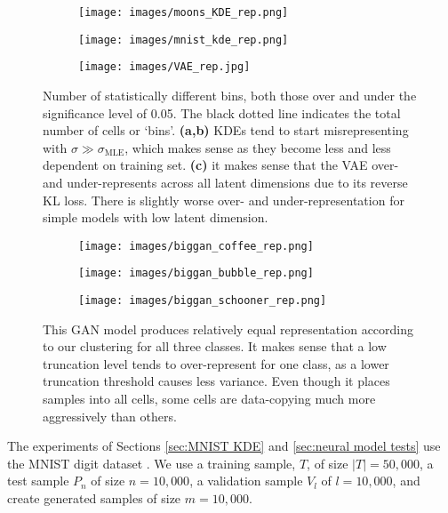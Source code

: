\begin{figure*}[h]
    \centering
    \begin{subfigure}{.31\linewidth}
        \centering
        \texttt{[image: images/moons\_KDE\_rep.png]}
        \caption{}\label{fig:moons KDE rep}
    \end{subfigure}
        \hfill
    \begin{subfigure}{.31\linewidth}
        \centering
        \texttt{[image: images/mnist\_kde\_rep.png]}
        \caption{}\label{fig:mnist kde rep}
    \end{subfigure}
        \hfill
    \begin{subfigure}{.31\linewidth}
        \centering
        \texttt{[image: images/VAE\_rep.jpg]}
        \caption{}\label{fig:vae rep}
    \end{subfigure}
    \caption{Number of statistically different bins, both those over and under the significance level of 0.05. The black dotted line indicates the total number of cells or `bins'. \textbf{(a,b)} KDEs tend to start misrepresenting with $\sigma \gg \sigma_{\text{MLE}}$, which makes sense as they become less and less dependent on training set. \textbf{(c)} it makes sense that the VAE over- and under-represents across all latent dimensions due to its reverse KL loss. There is slightly worse over- and under-representation for simple models with low latent dimension. }
    \label{fig:rep tests 1}
\end{figure*} 

\begin{figure*}[h]
    \centering
    \begin{subfigure}{.31\linewidth}
        \centering
        \texttt{[image: images/biggan\_coffee\_rep.png]}
        \caption{}\label{fig:moons KDE rep}
    \end{subfigure}
        \hfill
    \begin{subfigure}{.31\linewidth}
        \centering
        \texttt{[image: images/biggan\_bubble\_rep.png]}
        \caption{}\label{fig:mnist kde rep}
    \end{subfigure}
        \hfill
    \begin{subfigure}{.31\linewidth}
        \centering
        \texttt{[image: images/biggan\_schooner\_rep.png]}
        \caption{}\label{fig:vae rep}
    \end{subfigure}
    \caption{This GAN model produces relatively equal representation according to our clustering for all three classes. It makes sense that a low truncation level tends to over-represent for one class, as a lower truncation threshold causes less variance. Even though it places samples into all cells, some cells are data-copying much more aggressively than others.}
    \label{fig:biggan rep tests }
\end{figure*} 
The experiments of Sections \ref{sec:MNIST KDE} and \ref{sec:neural model tests} use the MNIST digit dataset \citep{lecun}. We use a training sample, $T$, of size $|T| = 50,000$, a test sample $P_n$ of size $n = 10,000$, a validation sample $V_l$ of $l = 10,000$, and create generated samples of size $m = 10,000$. 

